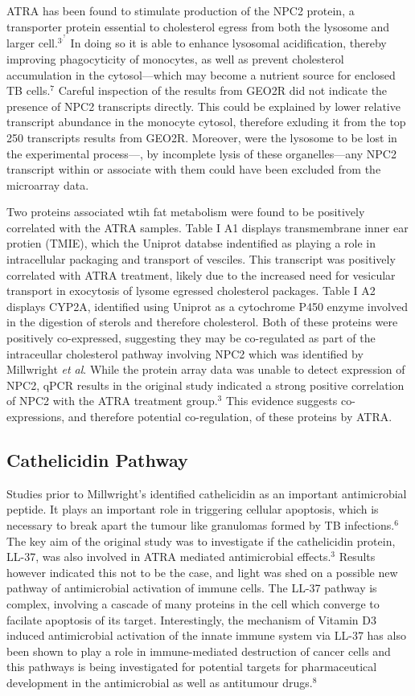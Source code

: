 \documentclass[letterpaper, 10 pt, conference]{ieeeconf}  %
\begin{document}
ATRA has been found to stimulate production of the NPC2 protein, a transporter protein essential to cholesterol egress from both the lysosome and larger cell.$^3^,^7$ In doing so it is able to enhance lysosomal acidification, thereby improving phagocyticity of monocytes, as well as prevent cholesterol accumulation in the cytosol---which may become a nutrient source for enclosed TB cells.$^7$ Careful inspection of the results from GEO2R did not indicate the presence of NPC2 transcripts directly. This could be explained by lower relative transcript abundance in the monocyte cytosol, therefore exluding it from the top 250 transcripts results from GEO2R. Moreover, were the lysosome to be lost in the experimental process---, by incomplete lysis of these organelles---any NPC2 transcript within or associate with them could have been excluded from the microarray data.

Two proteins associated wtih fat metabolism were found to be positively correlated with the ATRA samples. Table I A1 displays transmembrane inner ear protien (TMIE), which the Uniprot databse indentified as playing a role in intracellular packaging and transport of vesciles. This transcript was positively correlated with ATRA treatment, likely due to the increased need for vesicular transport in exocytosis of lysome egressed cholesterol packages. Table I A2 displays CYP2A, identified using Uniprot as a cytochrome P450 enzyme involved in the digestion of sterols and therefore cholesterol. Both of these proteins were positively co-expressed, suggesting they may be co-regulated as part of the intraceullar cholesterol pathway involving NPC2 which was identified by Millwright \textit{et al}. While the protein array data was unable to detect expression of NPC2, qPCR results in the original study indicated a strong positive correlation of NPC2 with the ATRA treatment group.$^3$ This evidence suggests co-expressions, and therefore potential co-regulation, of these proteins by ATRA.

\subsection{Cathelicidin Pathway}

Studies prior to Millwright's identified cathelicidin as an important antimicrobial peptide. It plays an important role in triggering cellular apoptosis, which is necessary to break apart the tumour like granulomas formed by TB infections.$^6$ The key aim of the original study was to investigate if the cathelicidin protein, LL-37, was also involved in ATRA mediated antimicrobial effects.$^3$ Results however indicated this not to be the case, and light was shed on a possible new pathway of antimicrobial activation of immune cells. The LL-37 pathway is complex, involving a cascade of many proteins in the cell which converge to facilate apoptosis of its target. Interestingly, the mechanism of Vitamin D3 induced antimicrobial activation of the innate immune system via LL-37 has also been shown to play a role in immune-mediated destruction of cancer cells and this pathways is being investigated for potential targets for pharmaceutical development in the antimicrobial as well as antitumour drugs.$^8$
\end{document}
